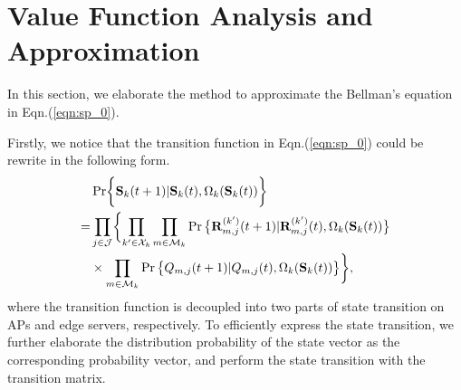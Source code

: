 \appendix
\section{Value Function Analysis and Approximation}
In this section, we elaborate the method to approximate the Bellman's equation in Eqn.(\ref{eqn:sp_0}).

Firstly, we notice that the transition function in Eqn.(\ref{eqn:sp_0}) could be rewrite in the following form.
\begin{align}
    & \Pr\Brace{ \Stat_{k}(t+1)|\Stat_{k}(t), \Omega_{k}(\Stat_{k}(t)) }
    \nonumber\\
    =& \prod_{j\in\jSpace} \Brace{
        \prod_{k'\in\ccSet_{k}}\prod_{m\in\esSet_{k}} \Pr\big\{
            \vec{R}^{(k')}_{m,j}(t+1) | \vec{R}^{(k')}_{m,j}(t), \Omega_{k}(\Stat_{k}(t))
        \big\}
        \nonumber\\
        &\times \prod_{m\in\esSet_{k}} \Pr\big\{
            Q_{m,j}(t+1) | Q_{m,j}(t), \Omega_{k}(\Stat_{k}(t))
        \big\}
    },
\end{align}
where the transition function is decoupled into two parts of state transition on APs and edge servers, respectively.
To efficiently express the state transition, we further elaborate the distribution probability of the state vector as the corresponding probability vector, and perform the state transition with the transition matrix.

